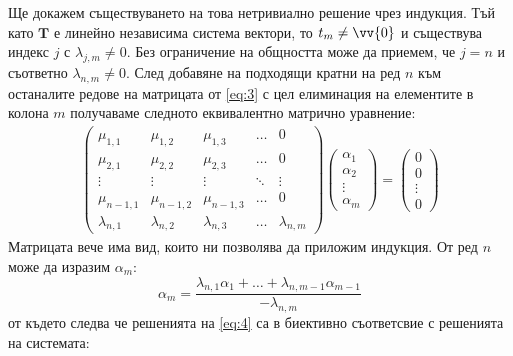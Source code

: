 \documentclass[a4paper,12pt,fleqn]{article}
\begin{document}
      Ще докажем съществуването на това нетривиално решение чрез индукция. Тъй като \( \textbf{T} \) е линейно независима система вектори, то \( t_{m} \neq \vv{0} \) и съществува индекс \( j \) с \( \lambda_{j,m} \neq 0 \). Без ограничение на общността може да приемем, че \( j = n \) и съответно \( \lambda_{n, m} \neq 0 \).
      След добавяне на подходящи кратни на ред \( n \) към останалите редове на матрицата от \eqref{eq:3} с цел елиминация на елементите в колона \( m \) получаваме следното еквивалентно матрично уравнение:
      \begin{gather}\label{eq:4}
        \begin{pmatrix}
          \mu_{1, 1} & \mu_{1, 2} & \mu_{1, 3} & \dots & 0 \\
          \mu_{2, 1} & \mu_{2, 2} & \mu_{2, 3} & \dots & 0 \\
          \vdots & \vdots & \vdots & \ddots & \vdots \\
          \mu_{n-1, 1} & \mu_{n-1, 2} & \mu_{n-1, 3} & \dots & 0 \\
          \lambda_{n, 1} & \lambda_{n, 2} & \lambda_{n, 3} & \dots & \lambda_{n, m} 
        \end{pmatrix}
        \begin{pmatrix}
          \alpha_{1} \\
          \alpha_{2} \\
          \vdots \\
          \alpha_{m}
        \end{pmatrix}
        =
        \begin{pmatrix}
          0 \\
          0 \\
          \vdots \\
          0
        \end{pmatrix}
      \end{gather}
      Матрицата вече има вид, които ни позволява да приложим индукция. От ред \( n \) може да изразим \( \alpha_{m} \):
      \begin{equation*}
        \alpha_{m}=\frac{\lambda_{n,1}\alpha_{1}+\dots+\lambda_{n,m-1}\alpha_{m-1}}{-\lambda_{n,m}}
      \end{equation*}
      от където следва че решенията на \eqref{eq:4} са в биективно съответсвие с решенията на системата:
\end{document}
